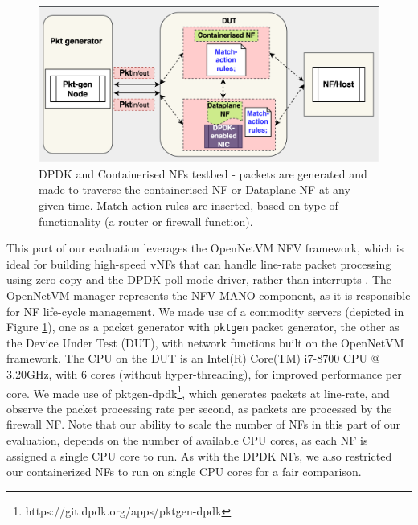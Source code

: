 \documentclass[conference]{IEEEtran}
\begin{document}
\begin{figure}[ht]
\centering
\includegraphics[width=0.92\columnwidth]{DPDK_Chain.png}
\caption{DPDK and Containerised NFs testbed - packets are generated and made to traverse the containerised NF or Dataplane NF at any given time. Match-action rules are inserted, based on type of functionality (a router or firewall function).}
\label{DPDK-Testbed}
\end{figure}
This part of our evaluation leverages the OpenNetVM NFV framework, which is ideal for building high-speed vNFs that can handle line-rate packet processing using zero-copy and the DPDK poll-mode driver, rather than interrupts \cite{zhang2016opennetvm}. The OpenNetVM manager represents the NFV MANO component, as it is responsible for NF life-cycle management. We made use of a commodity servers (depicted in Figure \ref{DPDK-Testbed}), one as a packet generator with \texttt{pktgen} packet generator, the other as the Device Under Test (DUT), with network functions built on the OpenNetVM framework. The CPU on the DUT is an Intel(R) Core(TM) i7-8700 CPU @ 3.20GHz, with 6 cores (without hyper-threading), for improved performance per core. We made use of pktgen-dpdk\footnote[2]{https://git.dpdk.org/apps/pktgen-dpdk}, which generates packets at line-rate, and observe the packet processing rate per second, as packets are processed by the firewall NF. Note that our ability to scale the number of NFs in this part of our evaluation, depends on the number of available CPU cores, as each NF is assigned a single CPU core to run. As with the DPDK NFs, we also restricted our containerized NFs to run on single CPU cores for a fair comparison.
\end{document}
